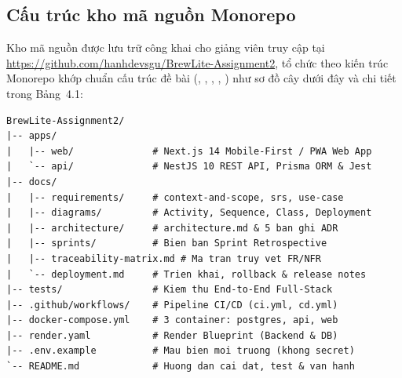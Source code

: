 \documentclass[12pt,a4paper]{report}
\begin{document}
\subsection{Cấu trúc kho mã nguồn Monorepo}
Kho mã nguồn được lưu trữ công khai cho giảng viên truy cập tại \url{https://github.com/hanhdevsgu/BrewLite-Assignment2}, tổ chức theo kiến trúc Monorepo khớp chuẩn cấu trúc đề bài (, , , , ) như sơ đồ cây dưới đây và chi tiết trong Bảng~4.1:

\noindent\begin{minipage}{\linewidth}
\begingroup\singlespacing\footnotesize
\begin{verbatim}
BrewLite-Assignment2/
|-- apps/
|   |-- web/              # Next.js 14 Mobile-First / PWA Web App
|   `-- api/              # NestJS 10 REST API, Prisma ORM & Jest
|-- docs/
|   |-- requirements/     # context-and-scope, srs, use-case
|   |-- diagrams/         # Activity, Sequence, Class, Deployment
|   |-- architecture/     # architecture.md & 5 ban ghi ADR
|   |-- sprints/          # Bien ban Sprint Retrospective
|   |-- traceability-matrix.md # Ma tran truy vet FR/NFR
|   `-- deployment.md     # Trien khai, rollback & release notes
|-- tests/                # Kiem thu End-to-End Full-Stack
|-- .github/workflows/    # Pipeline CI/CD (ci.yml, cd.yml)
|-- docker-compose.yml    # 3 container: postgres, api, web
|-- render.yaml           # Render Blueprint (Backend & DB)
|-- .env.example          # Mau bien moi truong (khong secret)
`-- README.md             # Huong dan cai dat, test & van hanh
\end{verbatim}
\endgroup
\end{minipage}\par\vspace{6pt}
\end{document}
